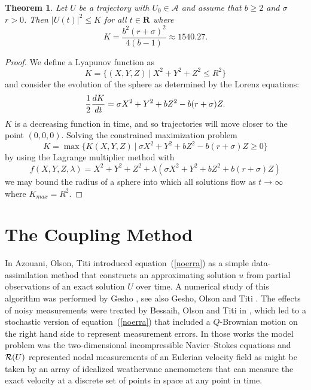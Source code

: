 \documentclass[master,tocprelim,12pt]{unrthesis}
\newtheorem{theorem}{Theorem}[chapter]
\theoremstyle{definition}
\numberwithin{equation}{chapter}
\begin{document}
\begin{manuscript}
\begin{theorem}
\label{Ktheorem} 
Let $U$ be a trajectory with 
$U_0\in \mathcal{A}$ and assume that $b\ge 2$ and $\sigma$ $r>0$. 
Then $|U(t)|^2 \leq K$ for all $t\in\textbf{R}$ where
\begin{equation}\label{Keqn}
    K = \frac{b^2(r+\sigma)^2}{4(b-1)}
\approx 1540.27.
\end{equation}
\end{theorem}
\begin{proof}
We define a Lyapunov function as
\begin{equation}\label{boundsEqn}
    K = \{(X,Y,Z) \ \vert \ X^2 + Y^2 + Z^2 \le R^2\}
\end{equation}
and consider the evolution of the sphere as determined by the Lorenz equations:
$$
{1\over 2} {dK\over dt} = \sigma X^2 + Y^2 + bZ^2 -b(r+\sigma)Z.\\
$$
$K$ is a decreasing function in time, and so trajectories will move closer to
the point $(0,0,0)$. Solving the constrained maximization problem 
$$
K = \max\{K(X,Y,Z)\ \vert \ \sigma X^2 + Y^2 + bZ^2 -b(r+\sigma)Z \ge 0\}
$$
by using the Lagrange multiplier method with
$$
    f(X,Y,Z,\lambda) = X^2 + Y^2 + Z^2 + \lambda(\sigma X^2 + Y^2 + bZ^2
    +b(r+\sigma)Z)
$$
we may bound the radius of a sphere into which all solutions flow as $t\to
\infty$ where $K_{max} = R^2$.
\end{proof}

\section{The Coupling Method}

In \cite{Olson14} Azouani, Olson, Titi 
introduced equation~(\ref{noerra}) as a simple
data-assimilation method that constructs an
approximating solution $u$ from partial observations
of an exact solution $U$ over time.
A numerical study of this algorithm was performed by
Gesho \cite{GeshoThesis}, see also Gesho, Olson and Titi \cite{Gesho16}.
The effects of noisy measurements were treated by
Bessaih, Olson and Titi in \cite{Bessaih15}, which led
to a stochastic version of equation~(\ref{noerra}) that
included a $Q$-Brownian motion on the right hand side
to represent measurement errors.
In those works the model problem was the two-dimensional
incompressible Navier--Stokes equations and ${\cal R}(U)$
represented nodal 
measurements of an Eulerian velocity field as might be taken 
by an array of idealized weathervane anemometers that can
measure the exact velocity at a discrete set of points in 
space at any point in time.


\end{manuscript}
\end{document}
